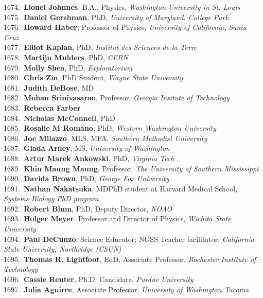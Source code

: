 1674.~{\bf Lionel Johnnes}, B.A., Physics, {\sl Washington University in St. Louis} \\
1675.~{\bf Daniel Gershman}, PhD, {\sl University of Maryland, College Park} \\
1676.~{\bf Howard Haber}, Professor of Physics, {\sl University of California, Santa Cruz} \\
1677.~{\bf Elliot Kaplan}, PhD, {\sl Institut des Sciences de la Terre} \\
1678.~{\bf Martijn Mulders}, PhD, {\sl CERN} \\
1679.~{\bf Molly Shea}, PhD, {\sl Exploratorium} \\
1680.~{\bf Chris Zin}, PhD Student, {\sl Wayne State University} \\
1681.~{\bf Judith DeBose}, MD \\
1682.~{\bf Mohan Srinivasarao}, Professor, {\sl Georgia Insitute of Technology} \\
1683.~{\bf Rebecca Farber} \\
1684.~{\bf Nicholas McConnell}, PhD \\
1685.~{\bf Rosalie M Romano}, PhD, {\sl Western Washington University} \\
1686.~{\bf Joe Milazzo}, MLS, MFA, {\sl Southern Methodist University} \\
1687.~{\bf Giada Arney}, MS, {\sl University of Washington } \\
1688.~{\bf Artur Marek Ankowski}, PhD, {\sl Virginia Tech} \\
1689.~{\bf Khin Maung Maung}, Professor, {\sl The University of Southern Mississippi} \\
1690.~{\bf Davida Brown}, PhD, {\sl George Fox University } \\
1691.~{\bf Nathan Nakatsuka}, MDPhD student at Harvard Medical School, {\sl Systems Biology PhD program} \\
1692.~{\bf Robert Blum}, PhD, Deputy Director, {\sl NOAO} \\
1693.~{\bf Holger Meyer}, Professor and Director of Physics, {\sl Wichita State University} \\
1694.~{\bf Paul DeCunzo}, Science Educator; NGSS Teacher facilitator, {\sl California State University, Northridge (CSUN)} \\
1695.~{\bf Thomas R. Lightfoot}, EdD, Associate Professor, {\sl Rochester Institute of Technology} \\
1696.~{\bf Cassie Reuter}, Ph.D. Candidate, {\sl Purdue University} \\
1697.~{\bf Julia Aguirre}, Associate Professor, {\sl University of Washington Tacoma} \\
